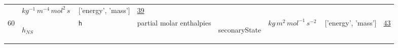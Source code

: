 \begin{longtable}{|p{1cm}|p{3cm}|p{3cm}|p{7cm}|p{3.0cm}|p{3cm}|p{2cm}|p{1cm}|}
             & $ kg^{-1} \,m^{-4} \,mol^{2} \,s \, $
             & ['energy', 'mass']
             & \hyperlink{"e:39"}{ 39 }
                 \\
    60
             & \hypertarget{"v:60"}{ $ {h}_{{N S}} $}
             & \verb|h|
             & partial molar enthalpies
             & \begin{lay}seconaryState \end{lay}
             & $ kg \,m^{2} \,mol^{-1} \,s^{-2} \, $
             & ['energy', 'mass']
             & \hyperlink{"e:43"}{ 43 }
                 \\
    \end{longtable}